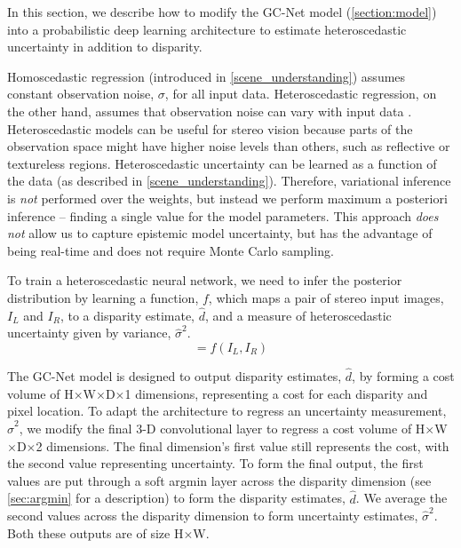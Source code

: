 In this section, we describe how to modify the GC-Net model (\cref{section:model}) into a probabilistic deep learning architecture to estimate heteroscedastic uncertainty in addition to disparity.

Homoscedastic regression (introduced in \cref{scene_understanding}) assumes constant observation noise, $\sigma$, for all input data. Heteroscedastic regression, on the other hand, assumes that observation noise can vary with input data \citep{nix1994estimating,le2005heteroscedastic}. Heteroscedastic models can be useful for stereo vision because parts of the observation space might have higher noise levels than others, such as reflective or textureless regions. Heteroscedastic uncertainty can be learned as a function of the data (as described in \cref{scene_understanding}). Therefore, variational inference is \textit{not} performed over the weights, but instead we perform maximum a posteriori inference -- finding a single value for the model parameters. This approach \textit{does not} allow us to capture epistemic model uncertainty, but has the advantage of being real-time and does not require Monte Carlo sampling.

To train a heteroscedastic neural network, we need to infer the posterior distribution by learning a function, $f$, which maps a pair of stereo input images, $I_{L}$ and $I_{R}$, to a disparity estimate, $\hat{d}$, and a measure of heteroscedastic uncertainty given by variance, $\hat{\sigma}^2$. 
\begin{equation}
[\hat{d}, \hat{\sigma}^2] = f(I_{L}, I_{R})
\end{equation}

The GC-Net model is designed to output disparity estimates, $\hat{d}$, by forming a cost volume of H$\times$W$\times$D$\times$1 dimensions, representing a cost for each disparity and pixel location. To adapt the architecture to regress an uncertainty measurement, $\hat{\sigma}^2$, we modify the final 3-D convolutional layer to regress a cost volume of H$\times$W$\times$D$\times$2 dimensions. The final dimension's first value still represents the cost, with the second value representing uncertainty. To form the final output, the first values are put through a soft argmin layer across the disparity dimension (see \cref{sec:argmin} for a description) to form the disparity estimates, $\hat{d}$. We average the second values across the disparity dimension to form uncertainty estimates, $\hat{\sigma}^2$. Both these outputs are of size H$\times$W.

